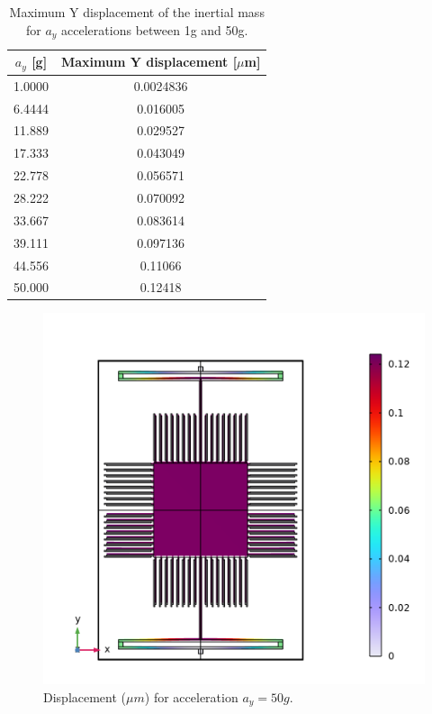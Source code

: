 \documentclass[lettersize,journal]{IEEEtran}
\begin{document}
    \begin{table}[h]
        \caption{Maximum Y displacement of the inertial mass for \(a_y\) accelerations between 1g and 50g.}
        \renewcommand{\arraystretch}{1.5}
        \centering
        \begin{tabular}{|c|c|}
            \hline
            \textbf{\(a_y\) [g]} & \textbf{Maximum Y displacement [\(\mu\)m]} \\ \hline
            1.0000       & 0.0024836                 \\ \hline
            6.4444       & 0.016005                \\ \hline
            11.889       & 0.029527                \\ \hline
            17.333       & 0.043049                 \\ \hline
            22.778       & 0.056571                 \\ \hline
            28.222       & 0.070092                 \\ \hline
            33.667       & 0.083614                 \\ \hline
            39.111       & 0.097136                 \\ \hline
            44.556       & 0.11066                 \\ \hline
            50.000       & 0.12418                 \\ \hline
        \end{tabular}
        \label{tab:max_y_disp}
    \end{table}
    
    \begin{figure}[!h]
        \centering
        \includegraphics[width=1.0\linewidth]{displacement_ay}
        \caption{Displacement (\(\mu m\)) for acceleration \(a_y=50g\).}
        \label{fig:disp_ay}
    \end{figure}
    
\end{document}

